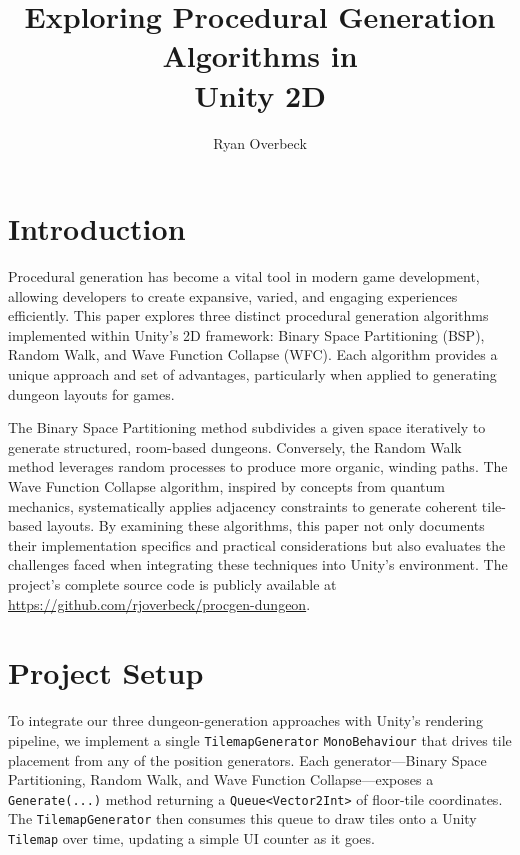 \documentclass[a4paper, 12pt, one column, aas_macros]{article}
\title{Exploring Procedural Generation Algorithms in \\Unity 2D}
\author{Ryan Overbeck}
\begin{document}
\maketitle


\tableofcontents


\section{Introduction}
Procedural generation has become a vital tool in modern game development, allowing developers to create expansive, varied, and engaging experiences efficiently. This paper explores three distinct procedural generation algorithms implemented within Unity's 2D framework: Binary Space Partitioning (BSP), Random Walk, and Wave Function Collapse (WFC). Each algorithm provides a unique approach and set of advantages, particularly when applied to generating dungeon layouts for games.

The Binary Space Partitioning method subdivides a given space iteratively to generate structured, room-based dungeons. Conversely, the Random Walk method leverages random processes to produce more organic, winding paths. The Wave Function Collapse algorithm, inspired by concepts from quantum mechanics, systematically applies adjacency constraints to generate coherent tile-based layouts. By examining these algorithms, this paper not only documents their implementation specifics and practical considerations but also evaluates the challenges faced when integrating these techniques into Unity's environment. The project's complete source code is publicly available at \url{https://github.com/rjoverbeck/procgen-dungeon}.

\section{Project Setup}
To integrate our three dungeon-generation approaches with Unity's rendering pipeline, we implement a single \texttt{TilemapGenerator} \texttt{MonoBehaviour} that drives tile placement from any of the position generators. Each generator---Binary Space Partitioning, Random Walk, and Wave Function Collapse---exposes a \texttt{Generate(...)} method returning a \texttt{Queue<Vector2Int>} of floor-tile coordinates. The \texttt{TilemapGenerator} then consumes this queue to draw tiles onto a Unity \texttt{Tilemap} over time, updating a simple UI counter as it goes.
\end{document}
